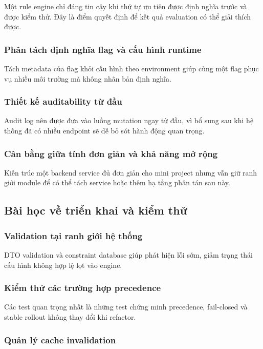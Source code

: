 Một rule engine chỉ đáng tin cậy khi thứ tự ưu tiên được định nghĩa trước và được kiểm thử. Đây là điểm quyết định để kết quả evaluation có thể giải thích được.

\subsubsection{Phân tách định nghĩa flag và cấu hình runtime}

Tách metadata của flag khỏi cấu hình theo environment giúp cùng một flag phục vụ nhiều môi trường mà không nhân bản định nghĩa.

\subsubsection{Thiết kế auditability từ đầu}

Audit log nên được đưa vào luồng mutation ngay từ đầu, vì bổ sung sau khi hệ thống đã có nhiều endpoint sẽ dễ bỏ sót hành động quan trọng.

\subsubsection{Cân bằng giữa tính đơn giản và khả năng mở rộng}

Kiến trúc một backend service đủ đơn giản cho mini project nhưng vẫn giữ ranh giới module để có thể tách service hoặc thêm hạ tầng phân tán sau này.

\subsection{Bài học về triển khai và kiểm thử}

\subsubsection{Validation tại ranh giới hệ thống}

DTO validation và constraint database giúp phát hiện lỗi sớm, giảm trạng thái cấu hình không hợp lệ lọt vào engine.

\subsubsection{Kiểm thử các trường hợp precedence}

Các test quan trọng nhất là những test chứng minh precedence, fail-closed và stable rollout không thay đổi khi refactor.

\subsubsection{Quản lý cache invalidation}


